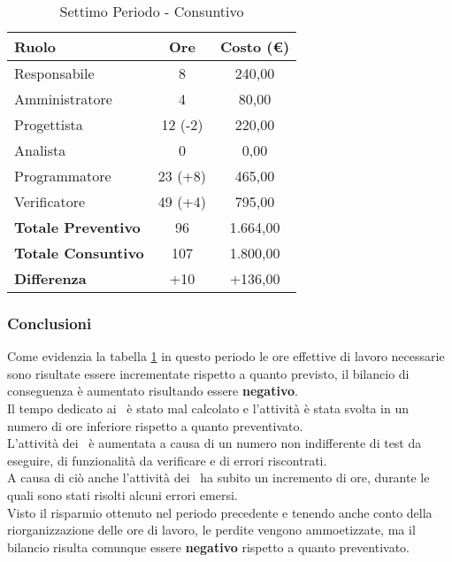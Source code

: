 \documentclass[../PianoDiProgetto_v4.0.0.tex]{subfiles}
\begin{document}
		\begin{table}[h]
				\centering
				\begin{tabular}{l * {2}{c}}
					\toprule
					\textbf{Ruolo} & \textbf{Ore} & \textbf{Costo (\euro{})} \\
					\midrule
					Responsabile & 8 & 240,00 \\

					Amministratore & 4 & 80,00 \\

					Progettista & 12 (-2) & 220,00 \\

					Analista & 0 & 0,00 \\		

					Programmatore & 23 (+8) & 465,00 \\		

					Verificatore & 49 (+4) & 795,00 \\				
					\midrule		
					\textbf{Totale Preventivo} & 96 & 1.664,00 \\
					\textbf{Totale Consuntivo} & 107  & 1.800,00 \\
					\midrule
					\textbf{Differenza} & +10  & +136,00 \\
					\bottomrule
				\end{tabular}
				\caption{Settimo Periodo - Consuntivo}
				\label{tab:consuntivo7}	
			\end{table}
		
		\subsubsection{Conclusioni}
		Come evidenzia la tabella \ref{tab:consuntivo7} in questo periodo le ore effettive di lavoro necessarie sono risultate essere incrementate rispetto a quanto previsto, il  bilancio di conseguenza è aumentato risultando essere \textbf{negativo}.\\
		Il tempo dedicato ai \progettisti\ è stato mal calcolato e l'attività è stata svolta in un numero di ore inferiore rispetto a quanto preventivato.\\
		L'attività dei \verificatori\ è aumentata a causa di un numero non indifferente di test da eseguire, di funzionalità da verificare e di errori riscontrati.\\
		A causa di ciò anche l'attività dei \programmatori\ ha subito un incremento di ore, durante le quali sono stati risolti alcuni errori emersi.\\
		Visto il risparmio ottenuto nel periodo precedente e tenendo anche conto della riorganizzazione delle ore di lavoro, le perdite vengono ammoetizzate, ma il bilancio risulta comunque essere \textbf{negativo} rispetto a quanto preventivato.\\
		
\end{document}
